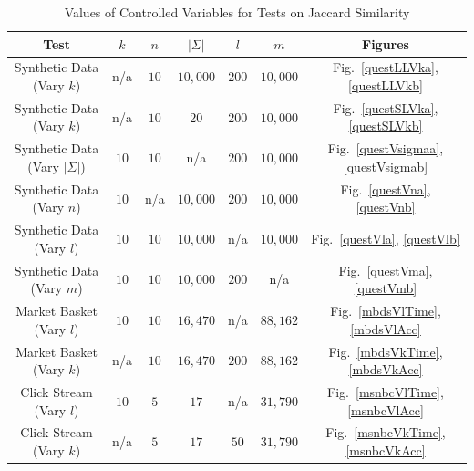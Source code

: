 \begin{table}[t]
\caption{Values of Controlled Variables for Tests on Jaccard Similarity}  
\label{defaultVal} 
\begin{center}%
{
    \begin{tabular}{ |c|c|c|c|c|c|c|}
    \hline
    Test  & $k$ & $n$ & $|\Sigma|$ & $l$& $m$ &Figures\\ \hline
    Synthetic Data (Vary $k$) & n/a  &  $10$ & $10,000$  & $200$ & $10,000$  & Fig.~\ref{questLLVka}, \ref{questLLVkb}\\ \hline
    Synthetic Data (Vary $k$) & n/a &  $10$ &  $20$ & $200$ & $10,000$ & Fig.~\ref{questSLVka}, \ref{questSLVkb}\\ \hline
    Synthetic Data (Vary $|\Sigma|$) & $10$ &  $10$ &  n/a & $200$ & $10,000$  & Fig.~\ref{questVsigmaa}, \ref{questVsigmab}\\ \hline
    Synthetic Data (Vary $n$) & $10$ &  n/a &  $10,000$ & $200$ & $10,000$  & Fig.~\ref{questVna}, \ref{questVnb}\\ \hline
    Synthetic Data (Vary $l$) & $10$ &  $10$ &  $10,000$ & n/a & $10,000$  & Fig.~\ref{questVla}, \ref{questVlb}\\ \hline
    Synthetic Data (Vary $m$) & $10$ &  $10$ & $10,000$ & $200$ &  n/a   & Fig.~\ref{questVma}, \ref{questVmb}\\ \hline
    Market Basket (Vary $l$) & $10$ &  $10$ & $16,470$ & n/a &  $88,162$   & Fig.~\ref{mbdsVlTime}, \ref{mbdsVlAcc}\\ \hline
    Market Basket (Vary $k$) & n/a &  $10$ & $16,470$ & $200$ &  $88,162$   & Fig.~\ref{mbdsVkTime}, \ref{mbdsVkAcc}\\ \hline
    Click Stream (Vary $l$) & $10$ &  $5$ & $17$ & n/a &  $31,790$   & Fig.~\ref{msnbcVlTime}, \ref{msnbcVlAcc}\\ \hline
    Click Stream (Vary $k$) & n/a &  $5$ & $17$ & $50$ &  $31,790$   & Fig.~\ref{msnbcVkTime}, \ref{msnbcVkAcc}\\ \hline
    \end{tabular}}
\end{center}
\end{table}

